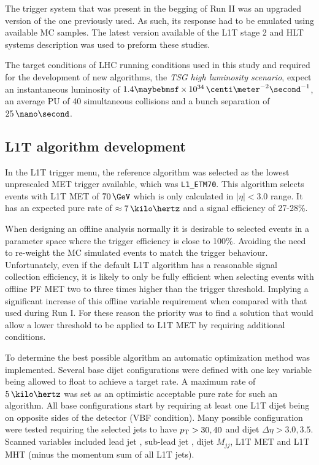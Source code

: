 The trigger system that was present in the begging of Run II was an upgraded version of the one previously used. As such, its response had to be emulated using available \gls{MC} samples. The latest version available of the \gls{L1T} stage 2 and \gls{HLT} systems description was used to preform these studies.

The target conditions of \gls{LHC} running conditions used in this study and required for the development of new algorithms, the \textit{\gls{TSG} high luminosity scenario}, expect an instantaneous luminosity of  $1.4 \times 10^{34}\,\centi\meter^{-2}\second^{-1}$, an average \gls{PU} of 40 simultaneous collisions and a bunch separation of $25\,\nano\second$. 

\subsection{L1T algorithm development}
\label{SECTION:RunIITriggerStudies_L1TAlgorithmDevelopment}


In the \gls{L1T} trigger menu, the reference algorithm was selected as the lowest unprescaled \gls{MET} trigger available, which was \verb|L1_ETM70|. This algorithm selects events with \gls{L1T} \gls{MET} of $70\,\GeV$ which is only calculated in $|\eta|<3.0$ range. It has an expected pure rate of $\approx 7\,\kilo\hertz$ and a signal efficiency of 27-28\%. 

When designing an offline analysis normally it is desirable to selected events in a parameter space where the trigger efficiency is close to 100\%. Avoiding the need to re-weight the \gls{MC} simulated events to match the trigger behaviour. Unfortunately, even if the default \gls{L1T} algorithm has a reasonable signal collection efficiency, it is likely to only be fully efficient when selecting events with offline \gls{PF} \gls{MET} two to three times higher than the trigger threshold. Implying a significant increase of this offline variable requirement when compared with that used during Run I. For these reason the priority was to find a solution that would allow a lower threshold to be applied to \gls{L1T} \gls{MET} by requiring additional conditions.

To determine the best possible algorithm an automatic optimization method was implemented. Several base dijet configurations were defined with one key variable being allowed to float to achieve a target rate. A maximum rate of $5\,\kilo\hertz$ was set as an optimistic acceptable pure rate for such an algorithm. All base configurations start by requiring at least one \gls{L1T} dijet being on opposite sides of the detector (\gls{VBF} condition). Many possible configuration were tested requiring the selected jets to have  $p_{\mathrm{T}}>{30,40}$ and dijet $\Delta\eta>{3.0,3.5}$. Scanned variables included lead jet \pt, sub-lead jet \pt, dijet $M_{jj}$, \gls{L1T} \gls{MET} and \gls{L1T} \gls{MHT} (minus the momentum sum of all \gls{L1T} jets). 


